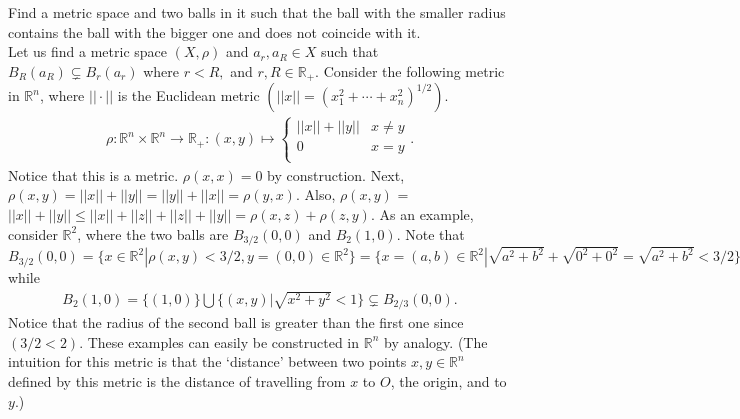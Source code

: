 \documentclass[document]{article}
\begin{document}
\begin{problem}[4.9] Find a metric space and two balls in it such that the ball with the smaller radius contains the ball with the bigger one and does not coincide with it.\\


Let us find a metric space $(X,\rho)$ and $a_r, a_R \in X$ such that $B_R(a_R) \subsetneq B_r(a_r)$ where $r<R,$ and $r, R \in \mathbb{R_+}.$ Consider the following metric in $\mathbb{R}^n$, where $|| \cdot ||$ is the Euclidean metric $(||x||=(x_1^2+\cdots+x_n^2)^{1/2})$.
\begin{align}
    \rho: \mathbb{R}^n \times \mathbb{R}^n \rightarrow \mathbb{R}_+ : (x,y) \mapsto \begin{cases} ||x||+||y|| & x \neq y \\ 0 & x=y \\ \end{cases}.
\end{align}
Notice that this is a metric. $\rho(x,x) = 0$ by construction. Next,  $\rho(x,y) = ||x|| + ||y|| = ||y|| + ||x|| = \rho(y,x)$. Also, $\rho(x,y)$ = $||x|| + ||y|| \leq  ||x||+||z||+||z||+||y||= \rho(x,z) + \rho(z,y)$. As an example, consider $\mathbb{R}^2$, where the two balls are $B_{3/2} (0,0)$ and $B_2 (1,0)$. Note that $B_{3/2}(0,0) = \{x \in \mathbb{R}^2 | \rho(x,y)<3/2, y= (0,0) \in \mathbb{R}^2 \} = \{x=(a,b)\in \mathbb{R}^2 |\sqrt{a^2+b^2}+\sqrt{0^2+0^2} = \sqrt{a^2+b^2} <3/2 \}$ while
\begin{align}
    B_2 (1,0)=\{(1,0)\} \bigcup \{(x,y)|\sqrt{x^2+y^2} < 1\} \subsetneq B_{2/3} (0,0).
\end{align} Notice that the radius of the second ball is greater than the first one since $(3/2<2)$. These examples can easily be constructed in $\mathbb{R}^n$ by analogy. (The intuition for this metric is that the `distance' between two points $x,y \in \mathbb{R}^n$ defined by this metric is the distance of travelling from $x$ to $O$, the origin, and to $y$.)
\end{problem}
\end{document}
